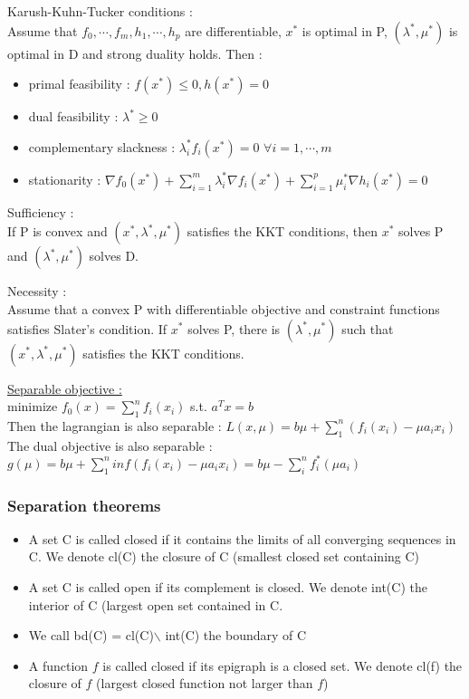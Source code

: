 \documentclass[../main.tex]{subfiles}
\begin{document}
\begin{theorem}
    Karush-Kuhn-Tucker conditions : \\
    Assume that $f_0, \cdots, f_m, h_1, \cdots, h_p$ are differentiable, $x^*$ is optimal in P, $(\lambda^*, \mu^*)$ is optimal in D and strong duality holds. Then : \begin{itemize}
        \item primal feasibility : $f(x^*)\leq 0, h(x^*)=0$
        \item dual feasibility : $\lambda^* \geq 0$
        \item complementary slackness : $\lambda_i^* f_i(x^*) = 0$ $\forall i=1,\cdots, m$
        \item stationarity : $\nabla f_0(x^*) + \sum_{i=1}^m \lambda_i^* \nabla f_i(x^*) + \sum_{i=1}^p \mu_i^* \nabla h_i(x^*) = 0$
    \end{itemize}
\end{theorem}

\begin{theorem}
    Sufficiency : \\
    If P is convex and $(x^*, \lambda^*, \mu^*)$ satisfies the KKT conditions, then $x^*$ solves P and $(\lambda^*, \mu^*)$
 solves D.
 \end{theorem}

\begin{theorem}
    Necessity :\\
    Assume that a convex P with differentiable objective and constraint functions satisfies Slater's condition. If $x^*$ solves P, there is $(\lambda^*, \mu^*)$ such that $(x^*, \lambda^*, \mu^*)$ satisfies the KKT conditions.
\end{theorem}

\quad \underline{Separable objective :}\\
minimize $f_0(x) = \sum_1^n f_i(x_i)$ s.t. $a^Tx = b$\\
Then the lagrangian is also separable : $L(x,\mu) = b\mu + \sum_1^n (f_i(x_i) - \mu a_i x_i)$\\
The dual objective is also separable : $g(\mu) = b\mu + \sum_1^n inf(f_i(x_i) - \mu a_i x_i) = b\mu - \sum_i^n f_i^* (\mu a_i)$\\

\subsubsection{Separation theorems}
\begin{itemize}
    \item A set C is called closed if it contains the limits of all converging sequences in C. We denote cl(C) the closure of C (smallest closed set containing C)
    \item A set C is called open if its complement is closed. We denote int(C) the interior of C (largest open set contained in C.
    \item We call bd(C) = cl(C)$\backslash$ int(C) the boundary of C
    \item A function $f$ is called closed if its epigraph is a closed set. We denote cl(f) the closure of $f$ (largest closed function not larger than $f$)
\end{itemize}
\end{document}
